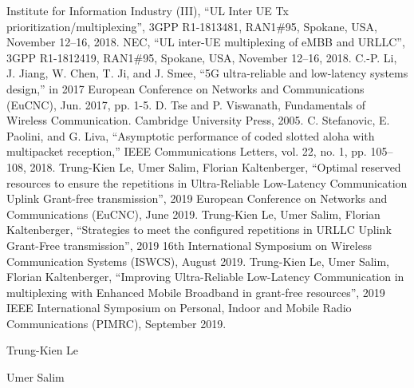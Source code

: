 \documentclass{ieeeaccess}
\begin{document}
\begin{thebibliography}{00}
  Institute for Information Industry (III), ``UL Inter UE Tx prioritization/multiplexing'', 3GPP R1-1813481, RAN1\#95, Spokane, USA, November 12--16, 2018.
  NEC, ``UL inter-UE multiplexing of eMBB and URLLC'', 3GPP R1-1812419, RAN1\#95, Spokane, USA, November 12--16, 2018.
  C.-P. Li, J. Jiang, W. Chen, T. Ji, and J. Smee, ``5G ultra-reliable and low-latency systems design,'' in 2017 European Conference on Networks and Communications (EuCNC), Jun. 2017, pp. 1-5. 
 D. Tse and P. Viswanath, Fundamentals of Wireless Communication. Cambridge University Press, 2005. 
 C. Stefanovic, E. Paolini, and G. Liva, ``Asymptotic performance of coded slotted aloha with multipacket reception,'' IEEE Communications Letters, vol. 22, no. 1, pp. 105--108, 2018.
 Trung-Kien Le, Umer Salim, Florian Kaltenberger, ``Optimal reserved resources to ensure the repetitions in Ultra-Reliable Low-Latency Communication Uplink Grant-free transmission'',  2019 European Conference on Networks and Communications (EuCNC), June 2019.
 Trung-Kien Le, Umer Salim, Florian Kaltenberger, ``Strategies to meet the configured repetitions in URLLC Uplink Grant-Free transmission'',  2019 16th International Symposium on Wireless Communication Systems (ISWCS), August 2019.
 Trung-Kien Le, Umer Salim, Florian Kaltenberger, ``Improving Ultra-Reliable Low-Latency Communication in multiplexing with Enhanced Mobile Broadband in grant-free resources'', 2019 IEEE International Symposium on Personal, Indoor and Mobile Radio Communications (PIMRC), September 2019.
\end{thebibliography}


\begin{IEEEbiography}{Trung-Kien Le} 
\end{IEEEbiography}

\begin{IEEEbiography}{Umer Salim} 
\end{IEEEbiography}
\end{document}

